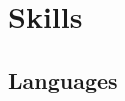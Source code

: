 \documentclass[letterpaper]{deedy-resume} %
\begin{document}
\begin{minipage}[t]{0.33\textwidth}
\sectionspace %




%


\section{Skills}

\subsection{Languages}


\end{minipage}
\end{document}
